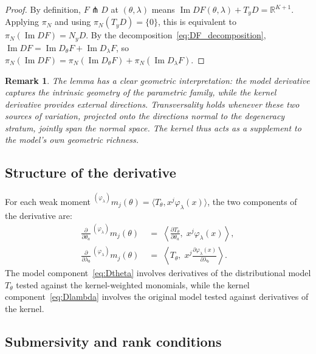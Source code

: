 \documentclass[11pt,a4paper]{article}
\newtheorem{remark}[theorem]{Remark}
\newcommand{\R}{\mathbb{R}}
\begin{document}
\begin{proof}
By definition, $F \pitchfork D$ at $(\theta,\lambda)$ means
$\operatorname{Im} DF(\theta,\lambda) + T_y D = \R^{K+1}$.  Applying
$\pi_N$ and using $\pi_N(T_y D) = \{0\}$, this is equivalent to
$\pi_N(\operatorname{Im} DF) = N_y D$.  By the
decomposition~\eqref{eq:DF_decomposition},
$\operatorname{Im} DF = \operatorname{Im} D_\theta F +
\operatorname{Im} D_\lambda F$, so
$\pi_N(\operatorname{Im} DF)
= \pi_N(\operatorname{Im} D_\theta F) +
\pi_N(\operatorname{Im} D_\lambda F)$.
\end{proof}

\begin{remark}
The lemma has a clear geometric interpretation: the model derivative
captures the intrinsic geometry of the parametric family, while the
kernel derivative provides external directions.  Transversality
holds whenever these two sources of variation, projected onto the
directions normal to the degeneracy stratum, jointly span the normal
space.  The kernel thus acts as a supplement to the model's own
geometric richness.
\end{remark}


\subsection{Structure of the derivative}

For each weak moment
${}^{(\varphi_\lambda)}m_j(\theta) =
\langle T_\theta, x^j \varphi_\lambda(x) \rangle$,
the two components of the derivative are:
\begin{align}
  \frac{\partial}{\partial \theta_a}\,
  {}^{(\varphi_\lambda)}m_j(\theta)
  &\;=\;
  \left\langle
  \frac{\partial T_\theta}{\partial \theta_a},\;
  x^j \varphi_\lambda(x)
  \right\rangle,
  \label{eq:Dtheta}
  \\[4pt]
  \frac{\partial}{\partial \lambda_b}\,
  {}^{(\varphi_\lambda)}m_j(\theta)
  &\;=\;
  \left\langle
  T_\theta,\;
  x^j \frac{\partial \varphi_\lambda(x)}{\partial \lambda_b}
  \right\rangle.
  \label{eq:Dlambda}
\end{align}
The model component~\eqref{eq:Dtheta} involves derivatives of the
distributional model $T_\theta$ tested against the kernel-weighted
monomials, while the kernel component~\eqref{eq:Dlambda} involves
the original model tested against derivatives of the kernel.


\subsection{Submersivity and rank conditions}
\end{document}
